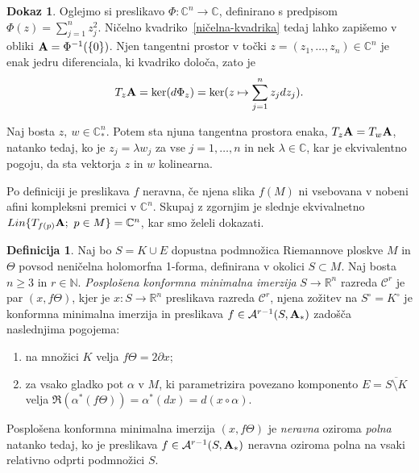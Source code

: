 \documentclass[12pt,a4paper,twoside]{article}
\theoremstyle{definition} %
\newtheorem{definicija}{Definicija}[section]
\newtheorem{dokaz}{Dokaz}
\theoremstyle{plain} %
\numberwithin{equation}{section}  %
\newcommand{\R}{\mathbb R}
\newcommand{\N}{\mathbb N}
\newcommand{\C}{\mathbb C}
\begin{document}
\begin{dokaz}
Oglejmo si preslikavo 
$\Phi \colon \C^{n} \to \C$, definirano s predpisom $\Phi(z) = \sum_{j=1}^{n} z_{j}^{2}$.
Ničelno kvadriko~\ref{ničelna-kvadrika} tedaj lahko zapišemo v obliki $\textbf{\textup{A}} = \Phi^{-1}( \{0 \} )$.
Njen tangentni prostor v točki $z = (z_{1}, \dots , z_{n}) \in \C^{n}$ je enak jedru diferenciala, ki kvadriko določa, zato je
\[ T_{z} \textbf{\textup{A}} = \ker (d \Phi_{z}) = \ker (z \mapsto \sum_{j=1}^{n} z_{j} dz_{j}). \]

Naj bosta $z, \ w \in \C_{*}^{n}$. Potem sta njuna tangentna prostora enaka, $ T_{z} \textbf{\textup{A}} = T_{w} \textbf{\textup{A}} $, natanko tedaj, ko je $z_{j} = \lambda w_{j}$ za vse $j = 1, \dots , n$ in nek $\lambda \in \C$, kar je ekvivalentno pogoju, da sta vektorja $z$ in $w$ kolinearna.

Po definiciji je preslikava $f$ neravna, če njena slika $f(M)$ ni vsebovana v nobeni afini kompleksni premici v $\C^{n}$. Skupaj z zgornjim je slednje ekvivalnetno 
$ Lin \{T_{f(p)} \textbf{\textup{A}} ; \ p \in M \} = \C^{n}$, kar smo želeli dokazati.
\end{dokaz}

\begin{definicija}
Naj bo $S = K \cup E$ dopustna podmnožica Riemannove ploskve $M$ in $\Theta$ povsod neničelna holomorfna 1-forma, definirana v okolici $S \subset M$.
Naj bosta $n \geq 3$ in $r \in \N$. \emph{Posplošena konformna minimalna imerzija} $S \to \R^{n}$ razreda $\mathcal{C}^{r}$ je par $(x, f \Theta)$, kjer je $x \colon S \to \R^{n}$ preslikava razreda  $\mathcal{C}^{r}$, njena zožitev na $S^\circ = K^\circ$ je konformna minimalna imerzija in preslikava $f \in \mathcal{A}^{r-1}(S, \textbf{\textup{A}}_{*})$ zadošča naslednjima pogojema:
\begin{enumerate}
\item na množici $K$ velja $f \Theta = 2 \partial x$;
\item za vsako gladko pot $\alpha$ v $M$, ki parametrizira povezano komponento $E = \overline{S \setminus K}$ velja $ \Re(\alpha^{*}(f \Theta)) = \alpha^{*}(dx) = d(x \circ \alpha)$.
\end{enumerate}
%
Posplošena konformna minimalna imerzija $(x, f \Theta)$ je \emph{neravna} oziroma \emph{polna} natanko tedaj, ko je preslikava $f \in \mathcal{A}^{r-1}(S, \textbf{\textup{A}}_{*})$ neravna oziroma polna na vsaki relativno odprti podmnožici $S$.
\end{definicija}
\end{document}
